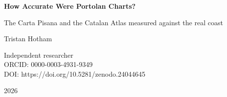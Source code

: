 \documentclass[11pt,a4paper]{article}
\begin{document}
\begin{center}
{\Large\bfseries How Accurate Were Portolan Charts?\par}
\vspace{0.4em}
{\large The Carta Pisana and the Catalan Atlas measured against the real coast\par}
\vspace{1.2em}
{\large Tristan Hotham\par}
\vspace{0.3em}
{\small Independent researcher\\
ORCID: 0000-0003-4931-9349\\
DOI: https://doi.org/10.5281/zenodo.24044645\par}
\vspace{0.8em}
2026
\end{center}
\end{document}
